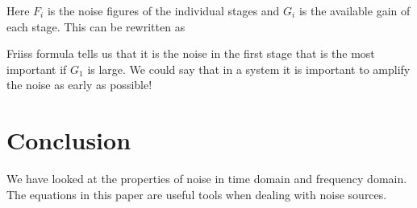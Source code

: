 \documentclass[final,a4paper]{IEEEtran}
\begin{document}
Here $F_i$ is the noise figures of the individual stages and $G_i$ is
the available gain of each stage. This can be rewritten as 


Friiss formula tells us that it is the noise in the first stage that
is the most important if $G_1$ is large. We could say that in a system
it is important to amplify the noise as early as possible!

\section{Conclusion}
We have looked at the properties of noise in time domain and frequency
domain. The equations in this paper are useful tools when dealing with
noise sources. 

\appendices



%
\end{document}
